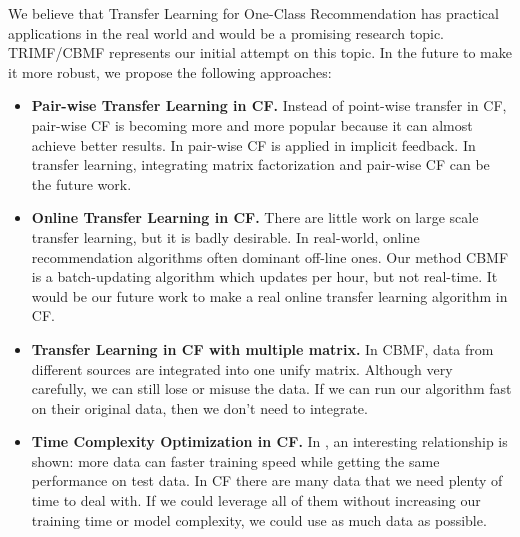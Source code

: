 We believe that Transfer Learning for One-Class Recommendation has practical applications in the real world and would be a promising research topic. TRIMF/CBMF represents our initial attempt on this topic. In the future to make it more robust, we propose the following approaches:
\begin{itemize}
\item {\bf Pair-wise Transfer Learning in CF.} Instead of point-wise transfer in CF, pair-wise CF is becoming more and more popular because it can almost achieve better results. In \cite{DBLP:dblp_conf/recsys/LercheJ14, DBLP:dblp_conf/recsys/Aiolli14} pair-wise CF is applied in implicit feedback. In transfer learning, integrating matrix factorization and pair-wise CF can be the future work.
\item {\bf Online Transfer Learning in CF.} There are little work on large scale transfer learning, but it is badly desirable. In real-world, online recommendation algorithms often dominant off-line ones. Our method CBMF is a batch-updating algorithm which updates per hour, but not real-time. It would be our future work to make a real online transfer learning algorithm in CF.
\item {\bf Transfer Learning in CF with multiple matrix.} In CBMF, data from different sources are integrated into one unify matrix. Although very carefully, we can still lose or misuse the data. If we can run our algorithm fast on their original data, then we don't need to integrate.
\item {\bf Time Complexity Optimization in CF.} In \cite{Shalev-Shwartz:2008:SOI:1390156.1390273}, an interesting relationship is shown: more data can faster training speed while getting the same performance on test data. In CF there are many data that we need plenty of time to deal with. If we could leverage all of them without increasing our training time or model complexity, we could use as much data as possible.
\end{itemize} 
